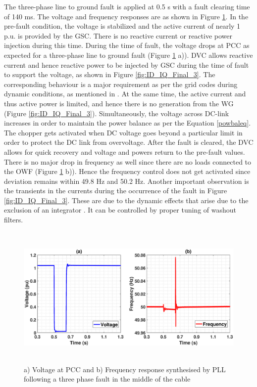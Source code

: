 The three-phase line to ground fault is applied at 0.5 s with a fault clearing time of 140 ms. The voltage and frequency responses are as shown in Figure \ref{fig:Vol_Freq_3phaseSC}. In the pre-fault condition, the voltage is stabilized and the active current of nearly 1 p.u. is provided by the \gls{GSC}. There is no reactive current or reactive power injection during this time. During the time of fault, the voltage drops at \gls{PCC} as expected for a three-phase line to ground fault (Figure \ref{fig:Vol_Freq_3phaseSC} a)). \gls{DVC} allows reactive current and hence reactive power to be injected by \gls{GSC} during the time of fault to support the voltage, as shown in Figure \ref{fig:ID_IQ_Final_3}. The corresponding behaviour is a major requirement as per the grid codes during dynamic conditions, as mentioned in \cite{mohseni_review_2012}. At the same time, the active current and thus active power is limited, and hence there is no generation from the \gls{WG} (Figure \ref{fig:ID_IQ_Final_3}). Simultaneously, the voltage across DC-link increases in order to maintain the power balance as per the Equation \ref{powbaleq}. The chopper gets activated when \gls{DC} voltage goes beyond a particular limit in order to protect the \gls{DC} link from overvoltage. After the fault is cleared, the \gls{DVC} allows for quick recovery and voltage and powers return to the pre-fault values. There is no major drop in frequency as well since there are no loads connected to the \gls{OWF} (Figure \ref{fig:Vol_Freq_3phaseSC} b)). Hence the frequency control does not get activated since deviation remains within 49.8 Hz and 50.2 Hz. Another important observation is the transients in the currents during the occurrence of the fault in Figure \ref{fig:ID_IQ_Final_3}. These are due to the dynamic effects that arise due to the exclusion of an integrator \cite{korai_dynamic_2019}. It can be controlled by proper tuning of washout filters.

\begin{figure}[H]
    \includegraphics[height = 7cm,width = \textwidth]{Diagrams/Chapter_3/VACP_Freq_Final_3.eps}
    \caption{a) Voltage at PCC and b) Frequency response synthesised by PLL following a three phase fault in the middle of the cable}
    \label{fig:Vol_Freq_3phaseSC}
\end{figure}


